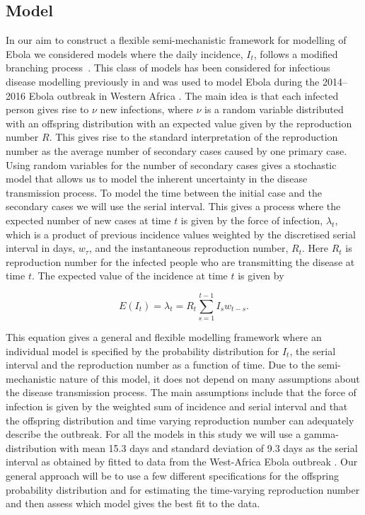 \documentclass[12pt]{article}
\begin{document}
\subsection{Model}

In our aim to construct a flexible semi-mechanistic framework for modelling of Ebola we considered models where the daily incidence, $I_t$, follows a modified branching process~\cite{jacobBranchingProcessesTheir2010}. This class of models has been considered for infectious disease modelling previously in \cite{coriNewFrameworkSoftware2013,lloyd-smithSuperspreadingEffectIndividual2005,nouvelletSimpleApproachMeasure2018} and was used to model Ebola during the 2014--2016 Ebola outbreak in Western Africa \cite{whoebolaresponseteamEbolaVirusDisease2014, internationalebolaresponseteamExposurePatternsDriving2016}. The main idea is that each infected person gives rise to $\nu$ new infections, where $\nu$ is a random variable distributed with an offspring distribution with an expected value given by the reproduction number $R$. This gives rise to the standard interpretation of the reproduction number as the average number of secondary cases caused by one primary case. Using random variables for the number of secondary cases gives a stochastic model that allows us to model the inherent uncertainty in the disease transmission process. To model the time between the initial case and the secondary cases we will use the serial interval. This gives a process where the expected number of new cases at time $t$ is given by the force of infection, $\lambda_t$, which is a product of previous incidence values weighted by the discretised serial interval in days, $w_\tau$, and the instantaneous reproduction number, $R_t$. Here $R_t$ is reproduction number for the infected people who are transmitting the disease at time $t$. The expected value of the incidence at time $t$ is given by

\begin{equation}
  E(I_t) = \lambda_t =  R_t \sum^{t-1}_{s=1} I_s w_{t-s}.
  \label{eq:mean_It}
\end{equation}

This equation gives a general and flexible modelling framework where an individual model is specified by the probability distribution for $I_t$, the serial interval and the reproduction number as a function of time. Due to the semi-mechanistic nature of this model, it does not depend on many assumptions about the disease transmission process. The main assumptions include that the force of infection is given by the weighted sum of incidence and serial interval and that the offspring distribution and time varying reproduction number can adequately describe the outbreak. For all the models in this study we will use a gamma-distribution with mean 15.3 days and standard deviation of 9.3 days as the serial interval as obtained by fitted to data from the West-Africa Ebola outbreak \cite{whoebolaresponseteamEbolaVirusDisease2014}. Our general approach will be to use a few different specifications for the offspring probability distribution and for estimating the time-varying reproduction number and then assess which model gives the best fit to the data.
\end{document}
